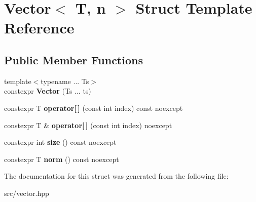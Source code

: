 \hypertarget{structVector}{}\section{Vector$<$ T, n $>$ Struct Template Reference}
\label{structVector}
\subsection*{Public Member Functions}
\begin{DoxyCompactItemize}
\item 
\mbox{\label{structVector_a689be1cfe09cca8fcacec8a5a494fd90}} 
{\footnotesize template$<$typename ... Ts$>$ }\\constexpr {\bfseries Vector} (Ts ... ts)
\item 
\mbox{\label{structVector_ac042df1b1796d2f74fa1b57e678b5cbe}} 
constexpr T {\bfseries operator\mbox{[}$\,$\mbox{]}} (const int index) const noexcept
\item 
\mbox{\label{structVector_aabe366c7f34fbd7aed51cb1b89e10277}} 
constexpr T \& {\bfseries operator\mbox{[}$\,$\mbox{]}} (const int index) noexcept
\item 
\mbox{\label{structVector_afe385496cc3cc581b050c7e6bcd6296c}} 
constexpr int {\bfseries size} () const noexcept
\item 
\mbox{\label{structVector_a93b4267e50ed2889478d9340d2bed3ca}} 
constexpr T {\bfseries norm} () const noexcept
\end{DoxyCompactItemize}


The documentation for this struct was generated from the following file\+:\begin{DoxyCompactItemize}
\item 
src/vector.\+hpp\end{DoxyCompactItemize}
